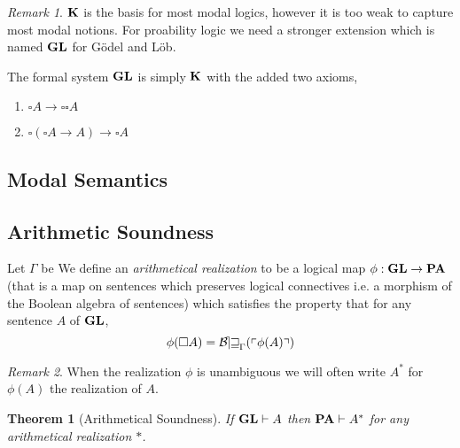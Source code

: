 \documentclass[12pt, leqno]{article}
\newcommand{\proves}{\vdash}
\newenvironment{definition}[1][Definition:]{\begin{trivlist}
\item[\hskip \labelsep {\bfseries #1}]}{\end{trivlist}}
\theoremstyle{theorem}
\newtheorem{theorem}{Theorem}[section]
\theoremstyle{definition}
\theoremstyle{definition}
\theoremstyle{remark}
\theoremstyle{definition}
\theoremstyle{remark}
\newtheorem{remark}{Remark}[subsection]
\begin{document}
\begin{remark}
$\mathbf{K}$ is the basis for most modal logics, however it is too weak to capture most modal notions. For proability logic we need a stronger extension which is named $\mathbf{GL}$ for G\"{o}del and L\"{o}b.
\end{remark}

\begin{definition}
The formal system $\mathbf{GL}$ is simply $\mathbf{K}$ with the added two axioms,
\begin{enumerate}
\item[(4)] $\square A \to \square \square A$
\item[(L)] $\square (\square A \to A) \to \square A$  
\end{enumerate}
\end{definition}

\subsection{Modal Semantics}

\subsection{Arithmetic Soundness}

\begin{definition}
Let $\Gamma$ be We define an \textit{arithmetical realization} to be a logical map $\phi : \mathbf{GL} \to \mathbf{PA}$ (that is a map on sentences which preserves logical connectives i.e. a morphism of the Boolean algebra of sentences) which satisfies the property that for any sentence $A$ of $\mathbf{GL}$,
\[ \phi(\square A) = \operatorname{\mathcal{B\mkern-2.0mu e\mkern-2.0mu w\mkern-1mu}}_{\Gamma}(\left\ulcorner \phi(A) \right\urcorner) \]
\end{definition}

\begin{remark}
When the realization $\phi$ is unambiguous we will often write $A^*$ for $\phi(A)$ the realization of $A$.
\end{remark}

\begin{theorem}[Arithmetical Soundness]
If $\GL \proves A$ then $\PA \proves A^*$ for any arithmetical realization $*$.
\end{theorem}
\end{document}
